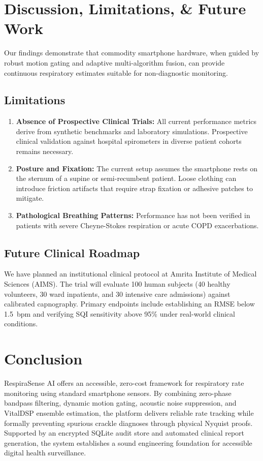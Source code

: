 \documentclass[journal,10pt,twocolumn]{IEEEtran}
\begin{document}
\section{Discussion, Limitations, \& Future Work}
Our findings demonstrate that commodity smartphone hardware, when guided by robust motion gating and adaptive multi-algorithm fusion, can provide continuous respiratory estimates suitable for non-diagnostic monitoring.

\subsection{Limitations}
\begin{enumerate}
    \item \textbf{Absence of Prospective Clinical Trials:} All current performance metrics derive from synthetic benchmarks and laboratory simulations. Prospective clinical validation against hospital spirometers in diverse patient cohorts remains necessary.
    \item \textbf{Posture and Fixation:} The current setup assumes the smartphone rests on the sternum of a supine or semi-recumbent patient. Loose clothing can introduce friction artifacts that require strap fixation or adhesive patches to mitigate.
    \item \textbf{Pathological Breathing Patterns:} Performance has not been verified in patients with severe Cheyne-Stokes respiration or acute COPD exacerbations.
\end{enumerate}

\subsection{Future Clinical Roadmap}
We have planned an institutional clinical protocol at Amrita Institute of Medical Sciences (AIMS). The trial will evaluate 100 human subjects (40 healthy volunteers, 30 ward inpatients, and 30 intensive care admissions) against calibrated capnography. Primary endpoints include establishing an RMSE below 1.5~bpm and verifying SQI sensitivity above 95\% under real-world clinical conditions.

\section{Conclusion}
RespiraSense AI offers an accessible, zero-cost framework for respiratory rate monitoring using standard smartphone sensors. By combining zero-phase bandpass filtering, dynamic motion gating, acoustic noise suppression, and VitalDSP ensemble estimation, the platform delivers reliable rate tracking while formally preventing spurious crackle diagnoses through physical Nyquist proofs. Supported by an encrypted SQLite audit store and automated clinical report generation, the system establishes a sound engineering foundation for accessible digital health surveillance.
\end{document}
